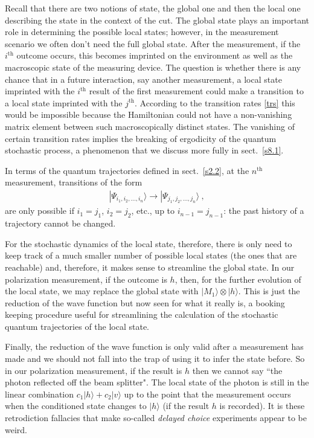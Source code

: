 \documentclass[12pt]{article}
\theoremstyle{plain}
\theoremstyle{definition}
\theoremstyle{remark}
\def\ket#1{| #1\rangle}
\newcommand{\EQ}[1]{\begin{equation}\begin{split} #1
\end{split}\end{equation}}
\begin{document}
Recall that there are two notions of state, the global one and then the local one describing the state in the context of the cut. The global state plays an important role in determining the possible local states; however, in the measurement scenario we often don't need the full global state.
After the measurement, if the $i^\text{th}$ outcome occurs, this becomes imprinted on the environment as well as the macroscopic state of the measuring device. The question is whether there is any chance that in a future interaction, say another measurement, a local state imprinted with the $i^\text{th}$ result of the first measurement could make a transition to a local state imprinted with the $j^\text{th}$. According to the transition rates \eqref{trs} this would be impossible because the Hamiltonian could not have a non-vanishing matrix element between such macroscopically distinct states. The vanishing of certain transition rates implies the breaking of ergodicity of the quantum stochastic process, a phenomenon that we discuss more fully in sect.~\ref{s8.1}.

In terms of the quantum trajectories defined in sect.~\ref{s2.2}, at the $n^\text{th}$ measurement, transitions of the form
\EQ{
\ket{\Psi_{i_1,i_2,\ldots,i_n}}\longrightarrow \ket{\Psi_{j_1,j_2,\ldots,j_n}}\ ,
}
are only possible if $i_1=j_1$, $i_2=j_2$, etc., up to $i_{n-1}=j_{n-1}$: the past history of a trajectory cannot be changed.

For the stochastic dynamics of the local state, therefore, there is only need to keep track of a much smaller number of possible local states (the ones 
that are reachable) and, therefore, it makes sense to streamline the global state. In our polarization measurement, if the outcome is $h$, then, for the further evolution of the local state, we may replace the global state with $\ket{M_1}\otimes\ket{h}$. This is just the reduction of the wave function but now seen for what it really is, a booking keeping procedure useful for streamlining the calculation of the stochastic quantum trajectories of the local state.

Finally, the reduction of the wave function is only valid after a measurement has made and we should not fall into the trap of using it to infer the state before. So in our polarization measurement, if the result is $h$ then we cannot say ``the photon reflected off the beam splitter". The local state of the photon is still in the linear combination $c_1\ket{h}+c_2\ket{v}$ 
up to the point that the measurement occurs when the conditioned state changes to $\ket{h}$ (if the result $h$ is recorded). It is these retrodiction fallacies that make so-called {\it delayed choice\/} experiments appear to be weird.
\end{document}
